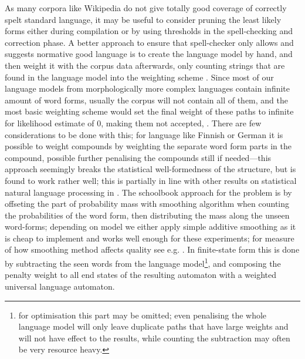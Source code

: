 \documentclass[a4paper,12pt]{article}
\begin{document}
As many corpora like Wikipedia do not give totally good coverage of correctly
spelt standard language, it may be useful to consider pruning the least likely
forms either during compilation or by using thresholds in the spell-checking
and correction phase. A better approach to ensure that spell-checker only
allows and suggests normative good language is to create the language model by
hand, and then weight it with the corpus data afterwards, only counting strings
that are found in the language model into the weighting scheme
\cite{pirinen/2009/nodalida}. Since most of our language models from
morphologically more complex languages contain infinite amount of word forms,
usually the corpus will not contain all of them, and the most basic weighting
scheme would set the final weight of these paths to infinite for likelihood
estimate of 0, making them not accepted, . There are few considerations to be
done with this; for language like Finnish or German \cite{schiller2006german}
it is possible to weight compounds by weighting the separate word form parts in
the compound, possible further penalising the compounds still if needed---this
approach seemingly breaks the statistical well-formedness of the structure, but
is found to work rather well; this is partially in line with other results on
statistical natural language processing in \cite{brants2007large}. The
schoolbook approach for the problem is by offseting the part of probability
mass with smoothing algorithm when counting the probabilities of the word form,
then distributing the mass along the unseen word-forms\cite[for a good
introduction to smoothing models we refer
to][]{jurafsky2000speech}; depending on model we either apply simple
additive smoothing as it is cheap to implement and works well enough for these
experiments; for measure of how smoothing method affects quality see e.g.
\cite{chen1999empirical}. In finite-state form this is done by subtracting the
seen words from the language model\footnote{for optimisation this part may be
    omitted; even penalising the whole language model will only leave duplicate
    paths that have large weights and will not have effect to the results,
    while counting the subtraction may often be very resource heavy.}, and
    composing the penalty weight to all end states of the resulting automaton
    with a weighted universal language automaton.
\end{document}
